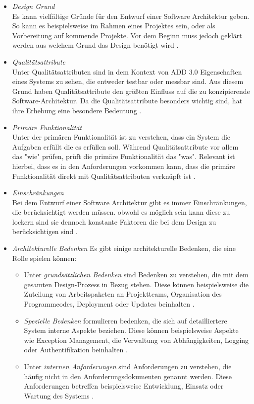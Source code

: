 \begin{itemize}
\item \emph{Design Grund} \\
Es kann vielfältige Gründe für den Entwurf einer Software Architektur geben. So kann es beispielsweise im Rahmen eines Projektes sein, oder als Vorbereitung auf kommende Projekte. Vor dem Beginn muss jedoch geklärt werden aus welchem Grund das Design benötigt wird \cite{add3}.
\item \emph{Qualitätsattribute} \\
Unter Qualitätsattributen sind in dem Kontext von ADD 3.0 Eigenschaften eines Systems zu sehen, die entweder testbar oder messbar sind. Aus diesem Grund haben Qualitätsattribute den größten Einfluss auf die zu konzipierende Software-Architektur. Da die Qualitätsattribute besonders wichtig sind, hat ihre Erhebung eine besondere Bedeutung \cite{add3}.
\item \emph{Primäre Funktionalität} \\
Unter der primären Funktionalität ist zu verstehen, dass ein System die Aufgaben erfüllt die es erfüllen soll. Während Qualitätsattribute vor allem das "wie" prüfen, prüft die primäre Funktionalität das "was". Relevant ist hierbei, dass es in den Anforderungen vorkommen kann, dass die primäre Funktionalität direkt mit Qualitätsattributen verknüpft ist \cite{add3}. 
\item \emph{Einschränkungen} \\
Bei dem Entwurf einer Software Architektur gibt es immer Einschränkungen, die berücksichtigt werden müssen. obwohl es möglich sein kann diese zu lockern sind sie dennoch konstante Faktoren die bei dem Design zu berücksichtigen sind \cite{add3}.
\item \emph{Architekturelle Bedenken} Es gibt einige architekturelle Bedenken, die eine Rolle spielen können:
\begin{itemize}
\item Unter \emph{grundsätzlichen Bedenken} sind Bedenken zu verstehen, die mit dem gesamten Design-Prozess in Bezug stehen. Diese können beispielsweise die Zuteilung von Arbeitspaketen an Projektteams, Organisation des Programmcodes, Deployment oder Updates beinhalten \cite{add3}.
\item \emph{Spezielle Bedenken} formulieren bedenken, die sich auf detailliertere System interne Aspekte beziehen. Diese können beispielsweise Aspekte wie Exception Management, die Verwaltung von Abhängigkeiten, Logging oder Authentifikation beinhalten \cite{add3}.
\item Unter \emph{internen Anforderungen} sind Anforderungen zu verstehen, die häufig nicht in den Anforderungsdokumenten genannt werden. Diese Anforderungen betreffen beispielsweise Entwicklung, Einsatz oder Wartung des Systems \cite{add3}.  

\end{itemize}
\end{itemize}
